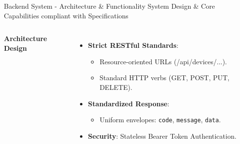 \documentclass[aspectratio=169, 10pt, xcolor=table]{beamer}
\begin{document}

\begin{frame}{Backend System - Architecture \& Functionality}
    {System Design \& Core Capabilities compliant with Specifications}
    
    \begin{columns}[c]

            \pause
            \textbf{Architecture Design}
            \vspace{0.3em}
            \begin{itemize}
                \item \textbf{Strict RESTful Standards}:
                \begin{itemize}
                    \item Resource-oriented URLs (/api/devices/...).
                    \item Standard HTTP verbs (GET, POST, PUT, DELETE).
                \end{itemize}
                \item \textbf{Standardized Response}:
                \begin{itemize}
                    \item Uniform envelopes: \texttt{code}, \texttt{message}, \texttt{data}.
                \end{itemize}
                \item \textbf{Security}: Stateless Bearer Token Authentication.
            \end{itemize}
    \end{columns}
\end{frame}
\end{document}
